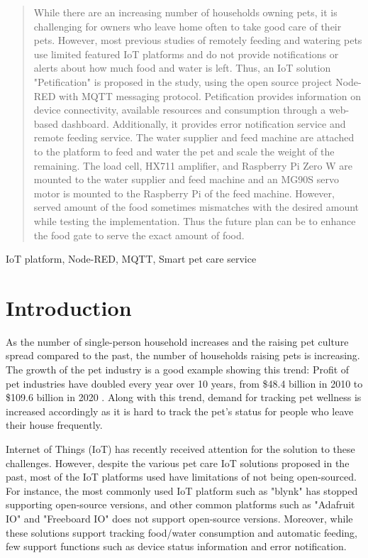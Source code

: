 ﻿\documentclass[conference]{IEEEtran}
\begin{document}
\begin{abstract}
While there are an increasing number of households owning pets, it is challenging for owners who leave home often to take good care of their pets.
However, most previous studies of remotely feeding and watering pets use limited featured IoT platforms and do not provide notifications or alerts about how much food and water is left.
Thus, an IoT solution "Petification" is proposed in the study, using the open source project Node-RED with MQTT messaging protocol.
Petification provides information on device connectivity, available resources and consumption through a web-based dashboard.
Additionally, it provides error notification service and remote feeding service.
The water supplier and feed machine are attached to the platform to feed and water the pet and scale the weight of the remaining.
The load cell, HX711 amplifier, and Raspberry Pi Zero W are mounted to the water supplier and feed machine and an MG90S servo motor is mounted to the Raspberry Pi of the feed machine.
However, served amount of the food sometimes mismatches with the desired amount while testing the implementation.
Thus the future plan can be to enhance the food gate to serve the exact amount of food. \\
\end{abstract}

\begin{IEEEkeywords}
IoT platform, Node-RED, MQTT, Smart pet care service 
\end{IEEEkeywords}

\section{Introduction}
As the number of single-person household increases and the raising pet culture spread compared to the past, the number of households raising pets is increasing.
The growth of the pet industry is a good example showing this trend: Profit of pet industries have doubled every year over 10 years, from \$48.4 billion in 2010 to \$109.6 billion in 2020 \cite{b1}.
Along with this trend, demand for tracking pet wellness is increased accordingly as it is hard to track the pet's status for people who leave their house frequently.

Internet of Things (IoT) has recently received attention for the solution to these challenges.
However, despite the various pet care IoT solutions proposed in the past, most of the IoT platforms used have limitations of not being open-sourced.
For instance, the most commonly used IoT platform such as "blynk" \cite{b2, b3, b4} has stopped supporting open-source versions, and other common platforms such as "Adafruit IO" \cite{b5} and "Freeboard IO" \cite{b6} does not support open-source versions. 
Moreover, while these solutions support tracking food/water consumption and automatic feeding, few support functions such as device status information and error notification.
\end{document}
